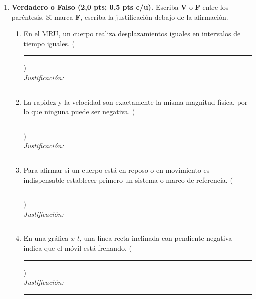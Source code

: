 \documentclass[12pt, letterpaper]{article}
\begin{document}
\begin{enumerate}[leftmargin=*, label=\textbf{\arabic*.}, itemsep=0.2em]
  \item \textbf{Verdadero o Falso (2,0 pts; 0,5 pts c/u).} Escriba \textbf{V} o \textbf{F} entre los paréntesis. Si marca \textbf{F}, escriba la justificación debajo de la afirmación.
        \begin{enumerate}[label=\alph*), leftmargin=1.8em, itemsep=0.75em]
          \item En el MRU, un cuerpo realiza desplazamientos iguales en intervalos de tiempo iguales. \hfill (\rule{0.7cm}{0.4pt}) \\[4pt]
                \textit{Justificación:} \rule{0.82\linewidth}{0.4pt}
          \item La rapidez y la velocidad son exactamente la misma magnitud física, por lo que ninguna puede ser negativa. \hfill (\rule{0.7cm}{0.4pt}) \\[4pt]
                \textit{Justificación:} \rule{0.82\linewidth}{0.4pt}
          \item Para afirmar si un cuerpo está en reposo o en movimiento es indispensable establecer primero un sistema o marco de referencia. \hfill (\rule{0.7cm}{0.4pt}) \\[4pt]
                \textit{Justificación:} \rule{0.82\linewidth}{0.4pt}
          \item En una gráfica $x$-$t$, una línea recta inclinada con pendiente negativa indica que el móvil está frenando. \hfill (\rule{0.7cm}{0.4pt}) \\[4pt]
                \textit{Justificación:} \rule{0.82\linewidth}{0.4pt}
        \end{enumerate}

  \vspace{6pt}


\end{enumerate}
\end{document}
